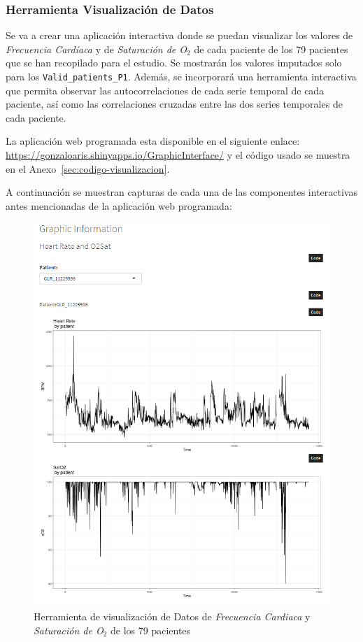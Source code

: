 \newpage
\subsubsection{Herramienta Visualización de Datos}\label{sec:visualizacion-datos}

Se va a crear una aplicación interactiva donde se puedan visualizar los valores de \textit{Frecuencia Cardíaca} y de \textit{Saturación de O$_2$} de cada paciente de los 79 pacientes que se han recopilado para el estudio. Se mostrarán los valores imputados solo para los \texttt{Valid\_patients\_P1}. Además, se incorporará una herramienta interactiva que permita observar las autocorrelaciones de cada serie temporal de cada paciente, así como las correlaciones cruzadas entre las dos series temporales de cada paciente.

La aplicación web programada esta disponible en el siguiente enlace: \url{https://gonzaloaris.shinyapps.io/GraphicInterface/} y el código usado se muestra en el Anexo~\ref{sec:codigo-visualizacion}.

A continuación se muestran capturas de cada una de las componentes interactivas antes mencionadas de la aplicación web programada:

\begin{figure}[H]
    \centering
    \includegraphics[scale = 1]{./img/graphic1.png}
    \caption{Herramienta de visualización de Datos de \textit{Frecuencia Cardiaca} y \textit{Saturación de O$_2$} de los 79 pacientes}\label{fig:visualizacion-datos-1}
\end{figure}

